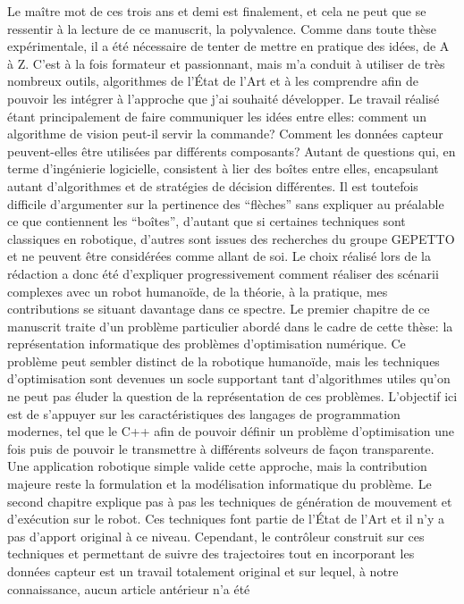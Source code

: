 Le maître mot de ces trois ans et demi est finalement, et cela ne peut
que se ressentir à la lecture de ce manuscrit, la polyvalence. Comme
dans toute thèse expérimentale, il a été nécessaire de tenter de
mettre en pratique des idées, de A à Z. C'est à la fois formateur et
passionnant, mais m'a conduit à utiliser de très nombreux outils,
algorithmes de l'État de l'Art et à les comprendre afin de pouvoir les
intégrer à l'approche que j'ai souhaité développer. Le travail réalisé
étant principalement de faire communiquer les idées entre elles:
comment un algorithme de vision peut-il servir la commande? Comment
les données capteur peuvent-elles être utilisées par différents
composants?  Autant de questions qui, en terme d'ingénierie
logicielle, consistent à lier des boîtes entre elles, encapsulant
autant d'algorithmes et de stratégies de décision différentes. Il est
toutefois difficile d'argumenter sur la pertinence des ``flèches''
sans expliquer au préalable ce que contiennent les ``boîtes'',
d'autant que si certaines techniques sont classiques en robotique,
d'autres sont issues des recherches du groupe GEPETTO et ne peuvent
être considérées comme allant de soi. Le choix réalisé lors de la
rédaction a donc été d'expliquer progressivement comment réaliser des
scénarii complexes avec un robot humanoïde, de la théorie, à la
pratique, mes contributions se situant davantage dans ce spectre. Le
premier chapitre de ce manuscrit traite d'un problème particulier
abordé dans le cadre de cette thèse: la représentation informatique
des problèmes d'optimisation numérique. Ce problème peut sembler
distinct de la robotique humanoïde, mais les techniques d'optimisation
sont devenues un socle supportant tant d'algorithmes utiles qu'on ne
peut pas éluder la question de la représentation de ces
problèmes. L'objectif ici est de s'appuyer sur les caractéristiques
des langages de programmation modernes, tel que le C++ afin de pouvoir
définir un problème d'optimisation une fois puis de pouvoir le
transmettre à différents solveurs de façon transparente. Une
application robotique simple valide cette approche, mais la
contribution majeure reste la formulation et la modélisation
informatique du problème. Le second chapitre explique pas à pas les
techniques de génération de mouvement et d'exécution sur le robot. Ces
techniques font partie de l'État de l'Art et il n'y a pas d'apport
original à ce niveau. Cependant, le contrôleur construit sur ces
techniques et permettant de suivre des trajectoires tout en
incorporant les données capteur est un travail totalement original et
sur lequel, à notre connaissance, aucun article antérieur n'a été

